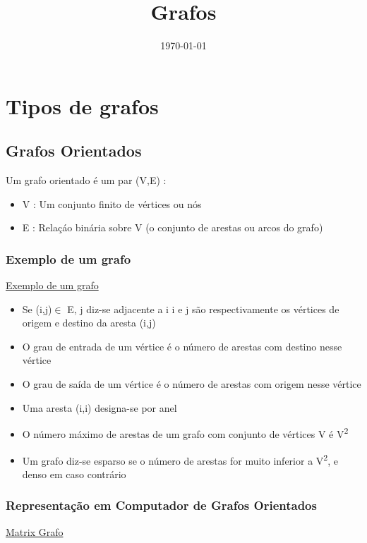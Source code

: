 \documentclass[11pt]{article}
\date{\today}
\title{Grafos}
\begin{document}
\maketitle
\tableofcontents

\section{Tipos de grafos}
\label{sec:org40f4aae}
\subsection{Grafos Orientados}
\label{sec:orgcb89a62}
Um grafo orientado é um par (V,E) :
\begin{itemize}
\item V : Um conjunto finito de vértices ou nós
\item E : Relaçáo binária sobre V (o conjunto de arestas ou arcos do grafo)
\end{itemize}

\subsubsection{Exemplo de um grafo}
\label{sec:org86d08e5}
\href{./exemplo\_grafo.png}{Exemplo de um grafo
}
\begin{itemize}
\item Se (i,j)\(\in\) E, j diz-se adjacente a i
i e j são respectivamente os vértices de origem e destino da aresta (i,j)

\item O grau de entrada de um vértice  é o número de arestas com destino nesse vértice
\item O grau de saída de um vértice  é o número de arestas com origem nesse vértice
\item Uma aresta (i,i) designa-se por anel
\item O número máximo de arestas de um grafo com conjunto de vértices V é V\textsuperscript{2}
\item Um grafo diz-se esparso se o número de arestas for muito inferior a V\textsuperscript{2}, e denso em caso contrário
\end{itemize}

\subsubsection{Representação em Computador de Grafos Orientados}
\label{sec:org4d78884}
\href{./matrix\_grafo.png}{Matrix Grafo}
\end{document}
